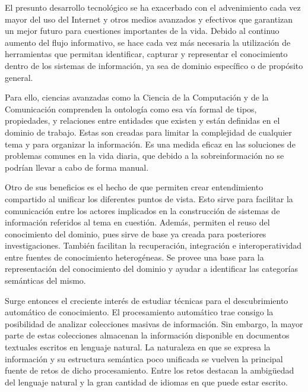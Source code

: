 \label{chapter:introduction}


El presunto desarrollo tecnológico se ha exacerbado con el advenimiento cada vez mayor del uso del Internet y otros medios avanzados y efectivos que garantizan un mejor futuro para cuestiones importantes de la vida. Debido al continuo aumento del flujo informativo, se hace cada vez más necesaria la utilización de herramientas que permitan identificar, capturar y representar el conocimiento dentro de los sistemas de información, ya sea de dominio específico o de propósito general.

Para ello, ciencias avanzadas como la Ciencia de la Computación y de la Comunicación comprenden la ontología como esa vía formal de tipos, propiedades, y relaciones entre entidades que existen y están definidas en el dominio de trabajo. Estas son creadas para limitar la complejidad de cualquier tema y para organizar la información. Es una medida eficaz en las soluciones de problemas comunes en la vida diaria, que debido a la sobreinformación no se podrían llevar a cabo de forma manual.

Otro de sus beneficios es el hecho de que permiten crear entendimiento compartido al unificar los diferentes puntos de vista. Esto sirve para facilitar la comunicación entre los actores implicados en la construcción de sistemas de información referidos al tema en cuestión. Además, permiten el reuso del conocimiento del dominio, pues sirve de base ya creada para posteriores investigaciones. También facilitan la recuperación, integración e interoperatividad entre fuentes de conocimiento heterogéneas. Se provee una base para la representación del conocimiento del dominio y ayudar a identificar las categorías semánticas del mismo.~\cite{ref:1}

Surge entonces el creciente interés de estudiar técnicas para el descubrimiento automático de conocimiento. El procesamiento automático trae consigo la posibilidad de analizar colecciones masivas de información. Sin embargo, la mayor parte de estas colecciones almacenan la información disponible en documentos textuales escritos en lenguaje natural. La naturaleza en que se expresa la información y su estructura semántica poco unificada se vuelven la principal fuente de retos de dicho procesamiento. Entre los retos destacan la ambigüedad del lenguaje natural y la gran cantidad de idiomas en que puede estar escrito.

